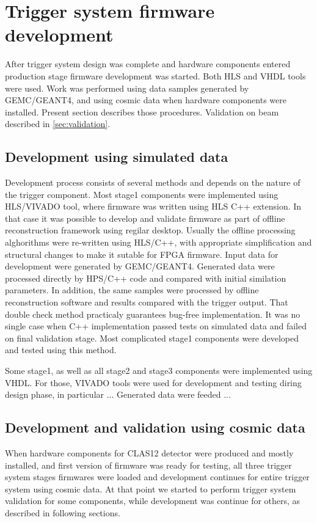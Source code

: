 \section{Trigger system firmware development}

After trigger system design was complete and hardware components entered production stage firmware development was started. Both HLS and VHDL tools were used. Work was performed using data samples generated by GEMC/GEANT4, and using cosmic data when hardware components were installed. Present section describes those procedures. Validation on beam described in \ref{sec:validation}.

\subsection{Development using simulated data}

Development process consists of several methods and depends on the nature of the trigger component. Most stage1 components were implemented using HLS/VIVADO tool, where firmware was written using HLS C++ extension. In that case it was possible to develop and validate firmware as part of offline reconstruction framework using regilar desktop. Usually the offline processing alghorithms were re-written using HLS/C++, with appropriate simplification and structural changes to make it sutable for FPGA firmware. Input data for development were generated by GEMC/GEANT4. Generated data were processed directly by HPS/C++ code and compared with initial similation parameters. In addition, the same samples were processed by offline reconstruction software and results compared with the trigger output. That double check method practicaly guarantees bug-free implementation. It was no single case when C++ implementation passed tests on simulated data and failed on final validation stage. Most complicated stage1 components were developed and tested using this method.

Some stage1, as well as all stage2 and stage3 components were implemented using VHDL. For those, VIVADO tools were used for development and testing diring design phase, in particular ...
Generated data were feeded ...

\subsection{Development and validation using cosmic data}

When hardware components for CLAS12 detector were produced and mostly installed, and first version of firmware was ready for testing, all three trigger system stages firmwares were loaded and development continues for entire trigger system using cosmic data. At that point we started to perform trigger system validation for some components, while development was continue for others, as described in following sections.

